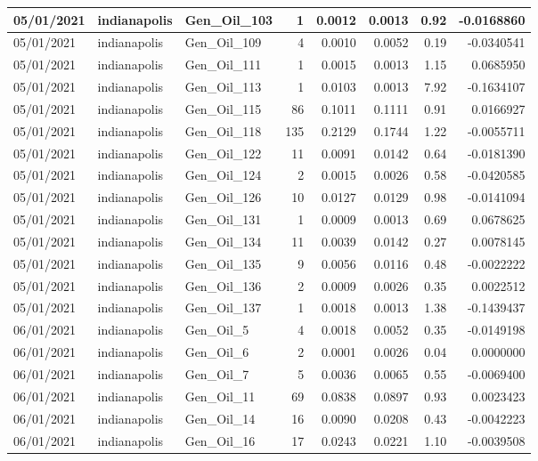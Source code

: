 \documentclass[
  letterpaper,
  DIV=11,
  numbers=noendperiod]{scrartcl}
\begin{document}
\begin{tabular}{l|l|l|r|r|r|r|r}
\hline
05/01/2021 & indianapolis & Gen\_Oil\_103 & 1 & 0.0012 & 0.0013 & 0.92 & -0.0168860\\
\hline
05/01/2021 & indianapolis & Gen\_Oil\_109 & 4 & 0.0010 & 0.0052 & 0.19 & -0.0340541\\
\hline
05/01/2021 & indianapolis & Gen\_Oil\_111 & 1 & 0.0015 & 0.0013 & 1.15 & 0.0685950\\
\hline
05/01/2021 & indianapolis & Gen\_Oil\_113 & 1 & 0.0103 & 0.0013 & 7.92 & -0.1634107\\
\hline
05/01/2021 & indianapolis & Gen\_Oil\_115 & 86 & 0.1011 & 0.1111 & 0.91 & 0.0166927\\
\hline
05/01/2021 & indianapolis & Gen\_Oil\_118 & 135 & 0.2129 & 0.1744 & 1.22 & -0.0055711\\
\hline
05/01/2021 & indianapolis & Gen\_Oil\_122 & 11 & 0.0091 & 0.0142 & 0.64 & -0.0181390\\
\hline
05/01/2021 & indianapolis & Gen\_Oil\_124 & 2 & 0.0015 & 0.0026 & 0.58 & -0.0420585\\
\hline
05/01/2021 & indianapolis & Gen\_Oil\_126 & 10 & 0.0127 & 0.0129 & 0.98 & -0.0141094\\
\hline
05/01/2021 & indianapolis & Gen\_Oil\_131 & 1 & 0.0009 & 0.0013 & 0.69 & 0.0678625\\
\hline
05/01/2021 & indianapolis & Gen\_Oil\_134 & 11 & 0.0039 & 0.0142 & 0.27 & 0.0078145\\
\hline
05/01/2021 & indianapolis & Gen\_Oil\_135 & 9 & 0.0056 & 0.0116 & 0.48 & -0.0022222\\
\hline
05/01/2021 & indianapolis & Gen\_Oil\_136 & 2 & 0.0009 & 0.0026 & 0.35 & 0.0022512\\
\hline
05/01/2021 & indianapolis & Gen\_Oil\_137 & 1 & 0.0018 & 0.0013 & 1.38 & -0.1439437\\
\hline
06/01/2021 & indianapolis & Gen\_Oil\_5 & 4 & 0.0018 & 0.0052 & 0.35 & -0.0149198\\
\hline
06/01/2021 & indianapolis & Gen\_Oil\_6 & 2 & 0.0001 & 0.0026 & 0.04 & 0.0000000\\
\hline
06/01/2021 & indianapolis & Gen\_Oil\_7 & 5 & 0.0036 & 0.0065 & 0.55 & -0.0069400\\
\hline
06/01/2021 & indianapolis & Gen\_Oil\_11 & 69 & 0.0838 & 0.0897 & 0.93 & 0.0023423\\
\hline
06/01/2021 & indianapolis & Gen\_Oil\_14 & 16 & 0.0090 & 0.0208 & 0.43 & -0.0042223\\
\hline
06/01/2021 & indianapolis & Gen\_Oil\_16 & 17 & 0.0243 & 0.0221 & 1.10 & -0.0039508\\

\end{tabular}
\end{document}
